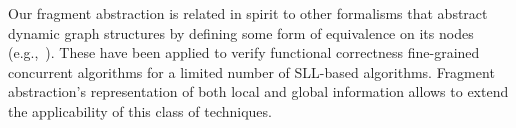 Our fragment abstraction is related in spirit to other formalisms that
abstract dynamic graph structures by defining some form of equivalence on
its nodes (e.g.,~\cite{spotlight07,SRW:threevalued,boxes13}). These have
been applied to verify functional correctness fine-grained concurrent
algorithms for a limited number of SLL-based algorithms. Fragment
abstraction's representation of both local and global information allows to
extend the applicability of this class of techniques.
%
%
%
%
%
